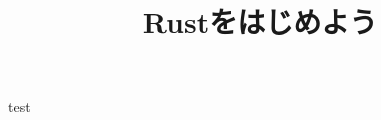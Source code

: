 \documentclass[dvipdfmx, 12pt]{beamer}
\title{Rustをはじめよう}
\begin{document}
\frame{
\maketitle
}
\begin{frame}
	test
\end{frame}
\end{document}
